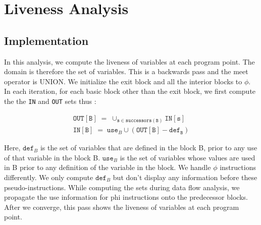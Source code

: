 

%

\section{Liveness Analysis}

\subsection{Implementation}

In this analysis, we compute the liveness of variables at each program point.
The domain is therefore the set of variables.
This is a backwards pass and the meet operator is UNION.
We initialize the exit block and all the interior blocks to $\phi$.
In each iteration, for each basic block other than the exit block, we
first compute the the \texttt{IN} and \texttt{OUT} sets thus :

\begin{align*}
\texttt{OUT}[\mathtt{B}] \; = \; \cup_{\mathtt{s} \in \texttt{successors}(\mathtt{B})} \texttt{IN}[\texttt{s}] \\
\texttt{IN}[\mathtt{B}] \; = \; \texttt{use}_{B} \cup (\texttt{OUT}[\mathtt{B}] - \texttt{def}_{\texttt{B}})
\end{align*}

Here,
$\texttt{def}_{B}$ is the set of variables that are defined in the block B, prior to any use of that
variable in the block B. $\texttt{use}_{B}$ is the set of variables whose values are used in B prior to any
definition of the variable in the block.
We handle $\phi$ instructions differently. We only compute $\texttt{def}_{B}$ but don't display any
information before these pseudo-instructions. While computing the sets during data flow analysis,
we propagate the use information for phi instructions onto the predecessor blocks. After we converge,
this pass shows the liveness of variables at each program point.


